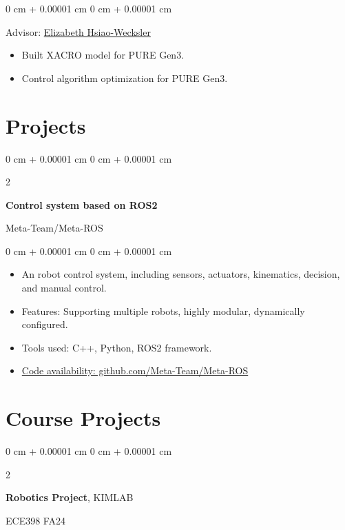 \documentclass[10pt, letterpaper]{article}
\newenvironment{highlights}{
    \begin{itemize}[
        topsep=0.10 cm,
        parsep=0.10 cm,
        partopsep=0pt,
        itemsep=0pt,
        leftmargin=0 cm + 10pt
    ]
}{
    \end{itemize}
} %
\newenvironment{onecolentry}{
    \begin{adjustwidth}{
        0 cm + 0.00001 cm
    }{
        0 cm + 0.00001 cm
    }
}{
    \end{adjustwidth}
} %
\newenvironment{twocolentry}[2][]{
    \onecolentry
    \def\secondColumn{#2}
    \setcolumnwidth{\fill, 4.5 cm}
    \begin{paracol}{2}
}{
    \switchcolumn \raggedleft \secondColumn
    \end{paracol}
    \endonecolentry
} %
\begin{document}
        \vspace{0.10 cm}
        \begin{onecolentry}
            Advisor: \href{https://bioengineering.illinois.edu/people/ethw}{Elizabeth Hsiao-Wecksler} 
            \begin{highlights}
                \item Built XACRO model for PURE Gen3.
                \item Control algorithm optimization for PURE Gen3.
            \end{highlights}
        \end{onecolentry}
        
        \vspace{0.2 cm}

    
    \section{Projects}
        
        \begin{twocolentry}{
            Meta-Team/Meta-ROS
        }
            \textbf{Control system based on ROS2}
        \end{twocolentry}

        \vspace{0.10 cm}
        \begin{onecolentry}
            \begin{highlights}
                \item An robot control system, including sensors, actuators, kinematics, decision, and manual control.
                \item Features: Supporting multiple robots, highly modular, dynamically configured.
                \item Tools used: C++, Python, ROS2 framework.
                \item \href{https://github.com/Meta-Team/Meta-ROS}{Code availability: github.com/Meta-Team/Meta-ROS}
            \end{highlights}
        \end{onecolentry}


        \vspace{0.2 cm}

    \section{Course Projects}

        \begin{twocolentry} {
            ECE398 FA24
        }
            \textbf{Robotics Project}, KIMLAB
        \end{twocolentry}
\end{document}
